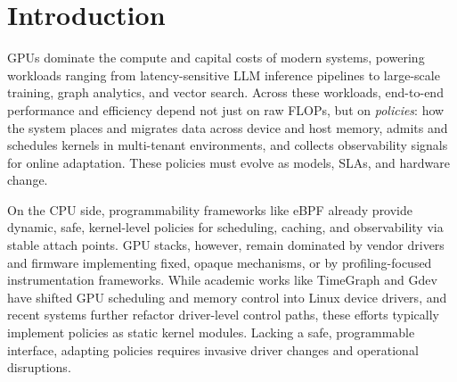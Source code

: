 \begin{abstract}
Performance in modern GPU-centric systems is increasingly defined by resource management policies, such as memory placement, scheduling, and observability, rather than just raw compute power. Currently, these policies are implemented at the wrong layer: either hard-coded into closed, static drivers and firmware, or siloed within user-space runtimes that lack transparency, cross-tenant visibility, and fine-grained hardware control. We argue that the OS GPU driver and device layer must serve as the system's programmable narrow waist. However, extending standard host-side eBPF is insufficient: it remains blind to critical device-side events, and naive injection into complex GPU-kernel risks system safety and efficiency.

We present \sys, a unified policy plane that treats the GPU driver and device as a single programmable OS subsystem. \sys extends GPU drivers to expose safe hooks and introduces a device-side eBPF runtime that executes verified policy logic efficiently within GPU kernels, enabling coherent, application-transparent policies that span the hardware boundary. Evaluation on realistic inference and training workloads shows that \sys improves throughput by up to  5× and reduces tail latency by 2× with negligible overhead, all without modifying applications or restarting drivers.
\end{abstract}

\section{Introduction}

GPUs dominate the compute and capital costs of modern systems, powering workloads ranging from latency-sensitive LLM inference pipelines to large-scale training, graph analytics, and vector search. Across these workloads, end-to-end performance and efficiency depend not just on raw FLOPs, but on \emph{policies}: how the system places and migrates data across device and host memory, admits and schedules kernels in multi-tenant environments, and collects observability signals for online adaptation. These policies must evolve as models, SLAs, and hardware change.

On the CPU side, programmability frameworks like eBPF already provide dynamic, safe, kernel-level policies for scheduling, caching, and observability via stable attach points\cite{Bachl21,Zhong22,jia2023programmable,schedext-docs,cacheext-docs}.
GPU stacks, however, remain dominated by vendor drivers and firmware implementing fixed, opaque mechanisms, or by profiling-focused instrumentation frameworks\cite{cupti,villa2019nvbit,neutrino,egpu}. While academic works like TimeGraph and Gdev have shifted GPU scheduling and memory control into Linux device drivers\cite{timegraph,gdev}, and recent systems further refactor driver-level control paths\cite{kernelintercept,gpreempt,lithos}, these efforts typically implement policies as static kernel modules. Lacking a safe, programmable interface, adapting policies requires invasive driver changes and operational disruptions.

